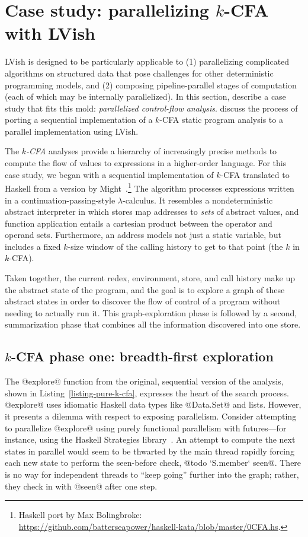 \section{Case study: parallelizing $k$-CFA with LVish}\label{s:lvish-k-cfa}

LVish is designed to be particularly applicable to (1) parallelizing
complicated algorithms on structured data that pose challenges for
other deterministic programming models, and (2) composing
pipeline-parallel stages of computation (each of which may be
internally parallelized).  In this section,  describe a
case study that fits this mold: \emph{parallelized control-flow
  analysis}.   discuss the process of porting a
sequential implementation of a $k$-CFA static program analysis to a
parallel implementation using LVish.

The \emph{$k$-CFA} analyses provide a hierarchy of increasingly
precise methods to compute the flow of values to expressions in a
higher-order language.  For this case study, we began with a
sequential implementation of $k$-CFA translated to Haskell from a
version by Might~.\footnote{Haskell port by
  Max Bolingbroke:
  \url{https://github.com/batterseapower/haskell-kata/blob/master/0CFA.hs}.}
The algorithm processes expressions written in a
continuation-passing-style $\lambda$-calculus.  It resembles a
nondeterministic abstract interpreter in which stores map addresses to
\emph{sets} of abstract values, and function application entails a
cartesian product between the operator and operand sets.  Furthermore,
an address models not just a static variable, but includes a fixed
$k$-size window of the calling history to get to that point (the $k$
in $k$-CFA).

Taken together, the current redex, environment, store, and call
history make up the abstract state of the program, and the goal is to
explore a graph of these abstract states in order to discover the flow
of control of a program without needing to actually run it.  This
graph-exploration phase is followed by a second, summarization phase
that combines all the information discovered into one store.

\subsection{$k$-CFA phase one: breadth-first exploration}

The @explore@ function from the original, sequential version of the
analysis, shown in Listing~\ref{listing-pure-k-cfa}, expresses the
heart of the search process.  @explore@ uses idiomatic Haskell data
types like @Data.Set@ and lists.  However, it presents a dilemma with
respect to exposing parallelism.  Consider attempting to parallelize
@explore@ using purely functional parallelism with futures---for
instance, using the Haskell Strategies library~\cite{marlow-par}.  An
attempt to compute the next states in parallel would seem to be
thwarted by the main thread rapidly forcing each new state to perform
the seen-before check, @todo `S.member` seen@.  There is no way for
independent threads to ``keep going'' further into the graph; rather,
they check in with @seen@ after one step.

